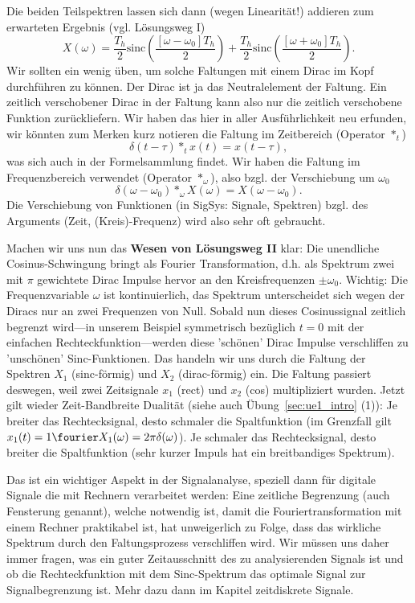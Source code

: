 \begin{ExCalc}
Die beiden Teilspektren lassen sich dann (wegen Linearität!) addieren zum erwarteten
Ergebnis (vgl. Lösungsweg I)
\begin{equation}
  X(\omega) =
  \frac{T_h}{2}\mathrm{sinc}\left(\frac{[\omega-\omega_0] T_h}{2}\right) +
  \frac{T_h}{2}\mathrm{sinc}\left(\frac{[\omega+\omega_0] T_h}{2}\right).
\end{equation}
Wir sollten ein wenig üben, um solche Faltungen mit einem Dirac
im Kopf durchführen zu können. Der Dirac ist ja das Neutralelement der Faltung.
Ein zeitlich verschobener Dirac in der Faltung kann also
nur die zeitlich verschobene Funktion zurückliefern.
Wir haben das hier in aller Ausführlichkeit neu erfunden, wir könnten zum Merken
kurz notieren die Faltung im Zeitbereich (Operator $\ast_t$)
\begin{equation}
  \delta(t-\tau) \ast_t x(t) = x(t-\tau),
\end{equation}
was sich auch in der Formelsammlung findet. Wir haben die Faltung im
Frequenzbereich verwendet (Operator $\ast_\omega$),
also bzgl. der Verschiebung um $\omega_0$
\begin{equation}
  \delta(\omega-\omega_0) \ast_\omega X(\omega) = X(\omega-\omega_0).
\end{equation}
Die Verschiebung von Funktionen (in SigSys: Signale, Spektren) bzgl. des
Arguments (Zeit, (Kreis)-Frequenz) wird also sehr oft gebraucht.

Machen wir uns nun das \textbf{Wesen von Lösungsweg II} klar: Die unendliche
Cosinus-Schwingung bringt als Fourier Transformation, d.h. als Spektrum zwei
mit $\pi$ gewichtete Dirac Impulse hervor an den Kreisfrequenzen $\pm\omega_0$.
Wichtig: Die Frequenzvariable $\omega$ ist kontinuierlich, das Spektrum unterscheidet sich
wegen der Diracs nur an zwei Frequenzen von Null.
Sobald nun dieses Cosinussignal zeitlich begrenzt wird---in unserem Beispiel
symmetrisch bezüglich $t=0$ mit der einfachen Rechteckfunktion---werden diese
'schönen' Dirac Impulse verschliffen zu 'unschönen' Sinc-Funktionen. Das handeln
wir uns durch die Faltung der Spektren $X_1$ (sinc-förmig) und $X_2$ (dirac-förmig)
ein. Die Faltung passiert deswegen, weil zwei Zeitsignale $x_1$ (rect) und $x_2$ (cos)
multipliziert wurden.
Jetzt gilt wieder Zeit-Bandbreite Dualität (siehe auch Übung~\ref{sec:ue1_intro} (1)):
Je breiter das Rechtecksignal, desto schmaler die Spaltfunktion
(im Grenzfall gilt $x_1(t)=1\fourier X_1(\omega) = 2\pi\delta(\omega)$).
Je schmaler das Rechtecksignal, desto breiter die Spaltfunktion (sehr kurzer Impuls
hat ein breitbandiges Spektrum).

Das ist ein wichtiger Aspekt in der Signalanalyse, speziell dann für
digitale Signale die mit Rechnern verarbeitet werden: Eine zeitliche Begrenzung
(auch Fensterung genannt),
welche notwendig ist, damit die Fouriertransformation mit einem Rechner
praktikabel ist,
hat unweigerlich zu Folge, dass das wirkliche Spektrum durch den Faltungsprozess
verschliffen wird. Wir müssen uns daher immer fragen, was ein guter Zeitausschnitt
des zu analysierenden Signals ist und ob die Rechteckfunktion mit dem
Sinc-Spektrum das optimale Signal zur Signalbegrenzung ist. Mehr dazu dann im Kapitel
zeitdiskrete Signale.
\end{ExCalc}


